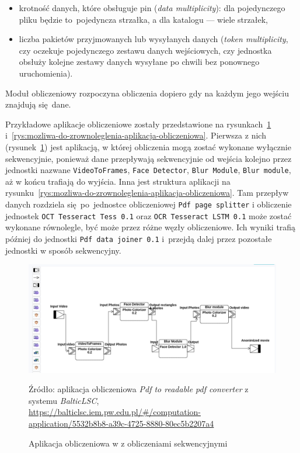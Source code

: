 \begin{itemize}
	\item krotność danych, które obsługuje pin (\emph{data
		      multiplicity}):  dla pojedynczego pliku będzie
	      to~pojedyncza strzałka, a dla katalogu --- wiele strzałek,
	\item liczba pakietów przyjmowanych lub wysyłanych danych (\emph{token
		      multiplicity}, czy oczekuje pojedynczego zestawu danych
	      wejściowych, czy jednostka obsłuży kolejne zestawy danych
	      wysyłane po chwili
	      bez ponownego uruchomienia).
\end{itemize}

Moduł obliczeniowy rozpoczyna obliczenia dopiero gdy na każdym jego wejściu
znajdują się~dane.

Przykładowe aplikacje obliczeniowe zostały przedstawione na
rysunkach~\ref{rys:sekwencyjna-aplikacja-obliczeniowa}
i~\ref{rys:mozliwa-do-zrownoleglenia-aplikacja-obliczeniowa}.
Pierwsza z nich (rysunek~\ref{rys:sekwencyjna-aplikacja-obliczeniowa}) jest
aplikacją, w której obliczenia mogą zostać wykonane
wyłącznie sekwencyjnie, ponieważ dane przepływają sekwencyjnie od wejścia
kolejno przez jednostki nazwane \texttt{VideoToFrames}, \texttt{Face Detector},
\texttt{Blur Module}, \texttt{Blur module}, aż w końcu trafiają do wyjścia.
Inna jest struktura aplikacji na
rysunku~\ref{rys:mozliwa-do-zrownoleglenia-aplikacja-obliczeniowa}. Tam
przepływ danych rozdziela się~po~jednostce obliczeniowej \texttt{Pdf page
	splitter} i obliczenie jednostek \texttt{OCT Tesseract Tess 0.1} oraz
\texttt{OCR Tesseract LSTM 0.1} może zostać wykonane równolegle, być może
przez różne węzły obliczeniowe. Ich wyniki trafią później do jednostki
\texttt{Pdf data joiner 0.1} i~przejdą dalej przez pozostałe jednostki w sposób
sekwencyjny.

\begin{figure}[!hb]
	\centering

	\includegraphics[width=0.95\linewidth]{./images/balticlsc-example-diagram.png}
	\caption{Aplikacja obliczeniowa w \BalticLSC{} z obliczeniami
		sekwencyjnymi}\label{rys:sekwencyjna-aplikacja-obliczeniowa}
	\medskip
	{\small Źródło: aplikacja obliczeniowa \emph{Pdf to readable pdf converter} z
		systemu \emph{BalticLSC},\\
		\url{https://balticlsc.iem.pw.edu.pl/#/computation-application/5532b8b8-a39c-4725-8880-80ec5b2207a4}
  }
\end{figure}

